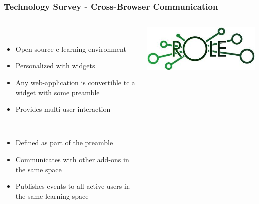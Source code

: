 \begin{frame}
\begin{columns}
\begin{column}{0.3\textwidth}
    \end{column}
  \end{columns}	
\end{frame}

\begin{frame}
  \frametitle{Technology Survey - Cross-Browser Communication}
  \begin{columns}
    \begin{column}{0.7\textwidth}
      \begin{description}[]
        \item[Role SDK] \hfill \\
        \begin{itemize}
          \item Open source e-learning environment 
          \item Personalized with widgets
          \item Any web-application is convertible to a widget with some preamble
          \item Provides multi-user interaction
        \end{itemize}
        \item[Inter-Widget Communication System] \hfill \\
        \begin{itemize}
          \item Defined as part of the preamble
          \item Communicates with other add-ons in the same space
          \item Publishes events to all active users in the same learning space
        \end{itemize}
      \end{description}  
    \end{column} 	
    \begin{column}{0.3\textwidth}
      \includegraphics[width=1\textwidth]{images/role}\\
      \bigskip
      \bigskip
      \bigskip

\end{column}
\end{columns}
\end{frame}

